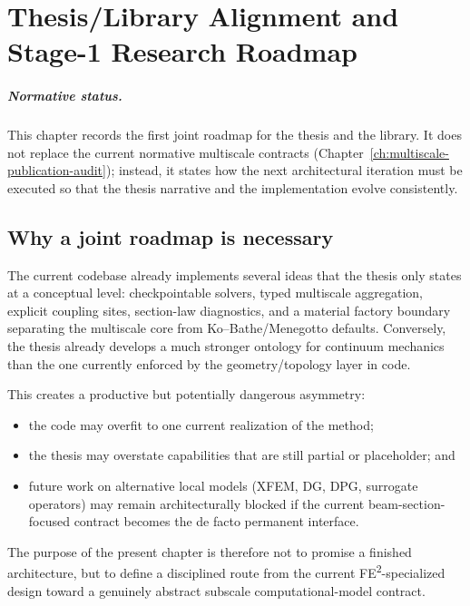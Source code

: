 
\chapter{Thesis/Library Alignment and Stage-1 Research Roadmap}
\label{ch:thesis-library-stage1}

\paragraph{Normative status.}
This chapter records the first joint roadmap for the thesis and the library.
It does not replace the current normative multiscale contracts
(Chapter~\ref{ch:multiscale-publication-audit}); instead, it states how the
next architectural iteration must be executed so that the thesis narrative and
the implementation evolve consistently.

\section{Why a joint roadmap is necessary}

The current codebase already implements several ideas that the thesis only
states at a conceptual level: checkpointable solvers, typed multiscale
aggregation, explicit coupling sites, section-law diagnostics, and a material
factory boundary separating the multiscale core from Ko--Bathe/Menegotto
defaults.  Conversely, the thesis already develops a much stronger ontology for
continuum mechanics than the one currently enforced by the geometry/topology
layer in code.

This creates a productive but potentially dangerous asymmetry:
\begin{itemize}
  \item the code may overfit to one current realization of the method;
  \item the thesis may overstate capabilities that are still partial or
  placeholder; and
  \item future work on alternative local models (XFEM, DG, DPG, surrogate
  operators) may remain architecturally blocked if the current
  beam-section-focused contract becomes the de facto permanent interface.
\end{itemize}

The purpose of the present chapter is therefore not to promise a finished
architecture, but to define a disciplined route from the current
FE\textsuperscript{2}-specialized design toward a genuinely abstract subscale
computational-model contract.


